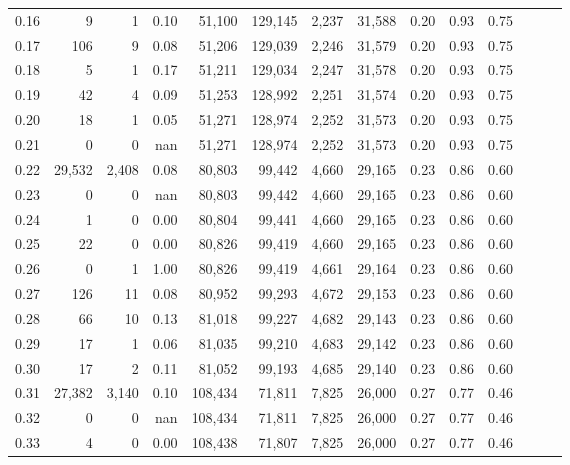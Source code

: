 \begin{tabular}{rrrrrrrrrrrrrr}
0.16 &       9 &      1 &  0.10 &   51,100 &  129,145 &   2,237 &  31,588 &  0.20 &  0.93 &      0.75 \\
0.17 &     106 &      9 &  0.08 &   51,206 &  129,039 &   2,246 &  31,579 &  0.20 &  0.93 &      0.75 \\
0.18 &       5 &      1 &  0.17 &   51,211 &  129,034 &   2,247 &  31,578 &  0.20 &  0.93 &      0.75 \\
0.19 &      42 &      4 &  0.09 &   51,253 &  128,992 &   2,251 &  31,574 &  0.20 &  0.93 &      0.75 \\
0.20 &      18 &      1 &  0.05 &   51,271 &  128,974 &   2,252 &  31,573 &  0.20 &  0.93 &      0.75 \\
0.21 &       0 &      0 &   nan &   51,271 &  128,974 &   2,252 &  31,573 &  0.20 &  0.93 &      0.75 \\
0.22 &  29,532 &  2,408 &  0.08 &   80,803 &   99,442 &   4,660 &  29,165 &  0.23 &  0.86 &      0.60 \\
0.23 &       0 &      0 &   nan &   80,803 &   99,442 &   4,660 &  29,165 &  0.23 &  0.86 &      0.60 \\
0.24 &       1 &      0 &  0.00 &   80,804 &   99,441 &   4,660 &  29,165 &  0.23 &  0.86 &      0.60 \\
0.25 &      22 &      0 &  0.00 &   80,826 &   99,419 &   4,660 &  29,165 &  0.23 &  0.86 &      0.60 \\
0.26 &       0 &      1 &  1.00 &   80,826 &   99,419 &   4,661 &  29,164 &  0.23 &  0.86 &      0.60 \\
0.27 &     126 &     11 &  0.08 &   80,952 &   99,293 &   4,672 &  29,153 &  0.23 &  0.86 &      0.60 \\
0.28 &      66 &     10 &  0.13 &   81,018 &   99,227 &   4,682 &  29,143 &  0.23 &  0.86 &      0.60 \\
0.29 &      17 &      1 &  0.06 &   81,035 &   99,210 &   4,683 &  29,142 &  0.23 &  0.86 &      0.60 \\
0.30 &      17 &      2 &  0.11 &   81,052 &   99,193 &   4,685 &  29,140 &  0.23 &  0.86 &      0.60 \\
0.31 &  27,382 &  3,140 &  0.10 &  108,434 &   71,811 &   7,825 &  26,000 &  0.27 &  0.77 &      0.46 \\
0.32 &       0 &      0 &   nan &  108,434 &   71,811 &   7,825 &  26,000 &  0.27 &  0.77 &      0.46 \\
0.33 &       4 &      0 &  0.00 &  108,438 &   71,807 &   7,825 &  26,000 &  0.27 &  0.77 &      0.46 \\

\end{tabular}
